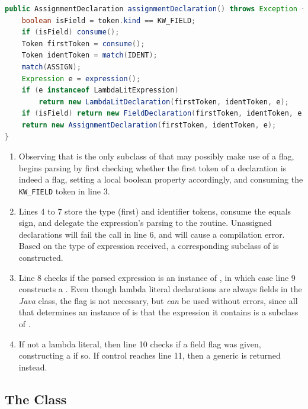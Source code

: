 \begin{lstlisting}[language=Java,caption={Parsing Top-Level Declarations.},label={alg:assign}]
public AssignmentDeclaration assignmentDeclaration() throws Exception {
	boolean isField = token.kind == KW_FIELD;
	if (isField) consume();
	Token firstToken = consume();
	Token identToken = match(IDENT);
	match(ASSIGN);
	Expression e = expression();
	if (e instanceof LambdaLitExpression)
		return new LambdaLitDeclaration(firstToken, identToken, e);
	if (isField) return new FieldDeclaration(firstToken, identToken, e);
	return new AssignmentDeclaration(firstToken, identToken, e);
}
\end{lstlisting}

\begin{enumerate}
	\addtocounter{enumi}{1}
	\item Observing that  is the only subclass of  that may possibly make use of a  flag,  begins parsing by first checking whether the first token of a declaration is indeed a  flag, setting a local boolean property accordingly, and consuming the \texttt{KW\_FIELD} token in line 3.
	\addtocounter{enumi}{1}
	\item Lines 4 to 7 store the type (first) and identifier tokens, consume the equals sign, and delegate the expression's parsing to the  routine. Unassigned declarations will fail the  call in line 6, and will cause a compilation error. Based on the type of expression received, a corresponding subclass of  is constructed.
	\addtocounter{enumi}{3}
	\item Line 8 checks if the parsed expression is an instance of , in which case line 9 constructs a . Even though lambda literal declarations are always fields in the \emph{Java} class, the  flag is not necessary, but \emph{can} be used without errors, since all that determines an instance of  is that the expression it contains is a subclass of .
	\item If not a lambda literal, then line 10 checks if a field flag was given, constructing a  if so. If control reaches line 11, then a generic  is returned instead.
\end{enumerate}

\subsection{The  Class}

